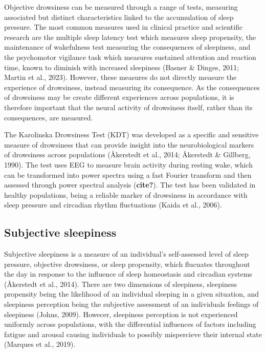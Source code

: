 \documentclass[
]{article}
\begin{document}
Objective drowsiness can be measured through a range of tests, measuring
associated but distinct characteristics linked to the accumulation of
sleep pressure. The most common measures used in clinical practice and
scientific research are the multiple sleep latency test which measures
sleep propensity, the maintenance of wakefulness test measuring the
consequences of sleepiness, and the psychomotor vigilance task which
measures sustained attention and reaction time, known to diminish with
increased sleepiness (Basner \& Dinges, 2011; Martin et al., 2023).
However, these measures do not directly measure the experience of
drowsiness, instead measuring its consequence. As the consequences of
drowsiness may be create different experiences across populations, it is
therefore important that the neural activity of drowsiness itself,
rather than its consequences, are measured.

The Karolinska Drowsiness Test (KDT) was developed as a specific and
sensitive measure of drowsiness that can provide insight into the
neurobiological markers of drowsiness across populations (Åkerstedt et
al., 2014; Åkerstedt \& Gillberg, 1990). The test uses EEG to measure
brain activity during resting wake, which can be transformed into power
spectra using a fast Fourier transform and then assessed through power
spectral analysis (\textbf{cite?}). The test has been validated in
healthy populations, being a reliable marker of drowsiness in accordance
with sleep pressure and circadian rhythm fluctuations (Kaida et al.,
2006).

\subsection{Subjective sleepiness}\label{subjective-sleepiness}

Subjective sleepiness is a measure of an individual's self-assessed
level of sleep pressure, objective drowsiness, or sleep propensity,
which flucuates throughout the day in response to the influence of sleep
homeostasis and circadian systems (Åkerstedt et al., 2014). There are
two dimensions of sleepiness, sleepiness propensity being the likelihood
of an individual sleeping in a given situation, and sleepiness
perception being the subjective assessment of an individuals feelings of
sleepiness (Johns, 2009). Howecer, sleepiness perception is not
experienced uniformly across populations, with the differential
influences of factors including fatigue and arousal causing individuals
to possibly mispercieve their internal state (Marques et al., 2019).
\end{document}
